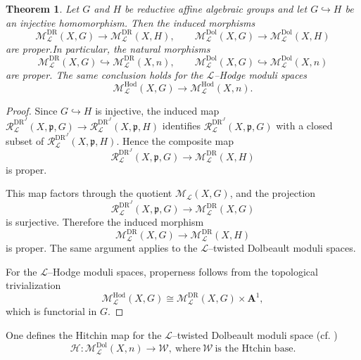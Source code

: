 \documentclass[12pt,reqno]{amsart}
\numberwithin{equation}{subsection}
\newtheorem{thm}[equation]{Theorem}
\theoremstyle{definition}
\theoremstyle{theorem}
\begin{document}
\begin{thm}\label{proper map between moduli of principal objects}
	Let $G$ and $H$ be reductive affine algebraic groups and let $
	G \hookrightarrow H$ 
	be an injective homomorphism. Then the induced morphisms 
	\[
	\mathcal{M}^{\text{DR}}_{\mathcal{L}}(X,G) \longrightarrow \mathcal{M}^{\text{DR}}_{\mathcal{L}}(X,H),
	\qquad
	\mathcal{M}^{\mathrm{Dol}}_{\mathcal{L}}(X,G)
	\longrightarrow
	\mathcal{M}^{\mathrm{Dol}}_{\mathcal{L}}(X,H)
	\]
	are proper.In particular, the natural morphisms
	\[
	\mathcal{M}^{\text{DR}}_{\mathcal{L}}(X,G) \hookrightarrow \mathcal{M}^{\text{DR}}_{\mathcal{L}}(X,n),
	\qquad
	\mathcal{M}^{\mathrm{Dol}}_{\mathcal{L}}(X,G)
	\hookrightarrow
	\mathcal{M}^{\mathrm{Dol}}_{\mathcal{L}}(X,n)
	\]
	are proper. The same conclusion holds for the $\mathcal{L}$--Hodge moduli spaces
	\[
	\mathcal{M}^{\mathrm{Hod}}_{\mathcal{L}}(X,G)
	\longrightarrow
	\mathcal{M}^{\mathrm{Hod}}_{\mathcal{L}}(X,n).
	\]
\end{thm}

\begin{proof}
	Since $G \hookrightarrow H$ is injective, the induced map $
	\mathcal{R}^{\text{DR}^{J}}_{\mathcal{L}}(X,\mathfrak{p},G)
	\longrightarrow
	\mathcal{R}^{\text{DR}^{J}}_{\mathcal{L}}(X,\mathfrak{p},H)
	$
	identifies $\mathcal{R}^{\text{DR}^{J}}_{\mathcal{L}}(X,\mathfrak{p},G)$ with a closed subset of
	$\mathcal{R}^{\text{DR}^{J}}_{\mathcal{L}}(X,\mathfrak{p},H)$. Hence the composite map
	\[
	\mathcal{R}^{\text{DR}^{J}}_{\mathcal{L}}(X,\mathfrak{p},G)
	\longrightarrow
	\mathcal{M}^{\text{DR}}_{\mathcal{L}}(X,H)
	\]
	is proper.
	
	This map factors through the quotient
	$\mathcal{M}_{\mathcal{L}}(X,G)$, and the projection
	\[
	\mathcal{R}^{\text{DR}^{J}}_{\mathcal{L}}(X,\mathfrak{p},G)
	\longrightarrow
	\mathcal{M}^{\text{DR}}_{\mathcal{L}}(X,G)
	\]
	is surjective. Therefore the induced morphism
	\[
	\mathcal{M}^{\text{DR}}_{\mathcal{L}}(X,G)
	\longrightarrow
	\mathcal{M}^{\text{DR}}_{\mathcal{L}}(X,H)
	\]
	is proper. The same argument applies to the $\mathcal{L}$--twisted Dolbeault moduli spaces.
	
	For the $\mathcal{L}$--Hodge moduli spaces, properness follows from the
	topological trivialization
	\[
	\mathcal{M}^{\mathrm{Hod}}_{\mathcal{L}}(X,G)
	\cong
	\mathcal{M}^{\text{DR}}_{\mathcal{L}}(X,G) \times \mathbf{A}^{1},
	\]
	which is functorial in $G$.
\end{proof}



One defines the Hitchin map for the $\mathcal{L}$--twisted Dolbeault moduli space
(cf. \cite[\S\,2, p.~9]{Alfaya-Oliveire-2024})
\[
\mathcal{H}:
\mathcal{M}^{\mathrm{Dol}}_{\mathcal{L}}(X,n)
\longrightarrow
\mathcal{W}, \ \text{where} \ \mathcal{W} \ \text{is the Htchin base.}
\]
\end{document}
